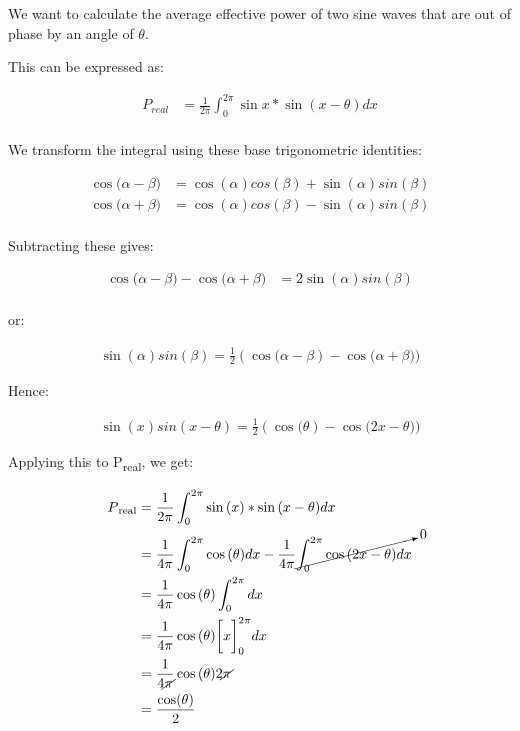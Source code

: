\documentclass[a4paper]{article}
\def\SB#1{\textsubscript{{#1}}}
\begin{document}
We want to calculate the average effective power of two sine waves that are out of phase by an angle of $\theta$.\

This can be expressed as:\

\begin{align*}
  P_{real} &=\frac{1}{2 \pi}\int_0^{2\pi}\sin{x} * \sin{(x - \theta)}dx\\
\end{align*}

We transform the integral using these base trigonometric identities:

\begin{align*}
  \cos{(\alpha - \beta}) &= \cos{(\alpha)} cos{(\beta)} +  \sin{(\alpha)} sin{(\beta)}\\
  \cos{(\alpha + \beta}) &= \cos{(\alpha)} cos{(\beta)} -  \sin{(\alpha)} sin{(\beta)}\\
\end{align*}

Subtracting these gives:

\begin{align*}
  \cos{(\alpha - \beta}) - \cos{(\alpha + \beta}) &= 2 \sin{(\alpha)} sin{(\beta)}\\
\end{align*}

or:

\begin{align*}
  \sin{(\alpha)} sin{(\beta)} = \frac{1}{2} (\cos{(\alpha - \beta}) - \cos{(\alpha + \beta}))
\end{align*}

Hence:

\begin{align*}
  \sin{(x)} sin{(x -\theta)} = \frac{1}{2} (\cos{(\theta}) - \cos{(2 x - \theta}))
\end{align*}

Applying this to P\SB{real}, we get:

\begin{align*}
  P\SB{real} &= \frac{1}{2 \pi}\int_0^{2\pi}\sin{(x)} * \sin{(x - \theta)}dx\\
  &= \frac{1}{4\pi}\int_0^{2\pi}\cos{(\theta}) dx - \frac{1}{4\pi}\cancelto{0}{\int_0^{2\pi}\cos{(2 x -\theta}) dx}\\
  &= \frac{1}{4\pi}\cos{(\theta})\int_0^{2\pi} dx\\
  &= \frac{1}{4\pi}\cos{(\theta}) \bigg[x \bigg]_{0}^{2\pi} dx\\
  &= \frac{1}{4 \cancel{\pi}}\cos{(\theta}) 2\cancel{\pi}\\
  &= \frac{\cos(\theta)}{2}
\end{align*}\
\end{document}
